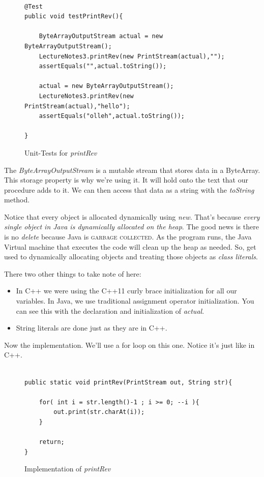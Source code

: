 \documentclass[]{tufte-handout}
\begin{document}
\begin{figure}
\begin{lstlisting}

@Test
public void testPrintRev(){

	ByteArrayOutputStream actual = new ByteArrayOutputStream();
	LectureNotes3.printRev(new PrintStream(actual),"");
	assertEquals("",actual.toString());

	actual = new ByteArrayOutputStream();
	LectureNotes3.printRev(new PrintStream(actual),"hello");
	assertEquals("olleh",actual.toString());

}

\end{lstlisting}
\label{fig:printrevtests}
\caption{Unit-Tests for \textit{printRev}}
\end{figure}

The \textit{ByteArrayOutputStream} is a mutable stream that stores data in a ByteArray. This storage property is why we're using it. It will hold onto the text that our procedure adds to it. We can then access that data as a string with the \textit{toString} method.

Notice that every object is allocated dynamically using \textit{new}. That's because \textit{every single object in Java is dynamically allocated on the heap}. The good news is there is no \textit{delete} because Java is \textsc{garbage collected}. As the program runs, the Java Virtual machine that executes the code will clean up the heap as needed. So, get used to dynamically allocating objects and treating those objects as \textit{class literals}.

There two other things to take note of here:
\begin{itemize}
\item In C++ we were using the C++11 curly brace initialization for all our variables. In Java, we use traditional assignment operator initialization. You can see this with the declaration and initialization of \textit{actual}.
\item String literals are done just as they are in C++.
\end{itemize}

Now the implementation. We'll use a for loop on this one. Notice it's just like in C++.

\begin{figure}
\begin{lstlisting}

public static void printRev(PrintStream out, String str){

	for( int i = str.length()-1 ; i >= 0; --i ){
		out.print(str.charAt(i));
	}

	return;
}

\end{lstlisting}
\label{fig:printrevimpl}
\caption{Implementation of \textit{printRev}}
\end{figure}
\end{document}

